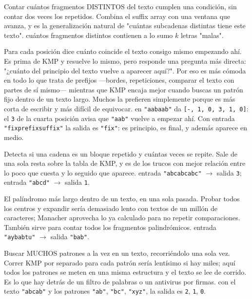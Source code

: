Contar cuántos fragmentos DISTINTOS del texto cumplen una condición, sin contar dos
veces los repetidos. Combina el suffix array con una ventana que avanza, y es la
generalización natural de "cuántas subcadenas distintas tiene este texto".
\ej cuántos fragmentos distintos contienen a lo sumo $k$ letras "malas".

Para cada posición dice cuánto coincide el texto consigo mismo empezando ahí. Es
prima de KMP y resuelve lo mismo, pero responde una pregunta más directa: "¿cuánto
del principio del texto vuelve a aparecer aquí?". Por eso es más cómoda en todo lo
que trata de prefijos —bordes, repeticiones, comparar el texto con partes de sí
mismo— mientras que KMP encaja mejor cuando buscas un patrón fijo dentro de un
texto largo. Muchos la prefieren simplemente porque es más corta de escribir y más
difícil de equivocar.
\ej en \texttt{"aabaab"} da \texttt{[-, 1, 0, 3, 1, 0]}: el \texttt{3} de la
cuarta posición avisa que \texttt{"aab"} vuelve a empezar ahí. Con entrada
\texttt{"fixprefixsuffix"} la salida es \texttt{"fix"}: es principio, es final, y
además aparece en medio.

Detecta si una cadena es un bloque repetido y cuántas veces se repite. Sale de una
sola resta sobre la tabla de KMP, y es de los trucos con mejor relación entre lo
poco que cuesta y lo seguido que aparece.
\ej entrada \texttt{"abcabcabc"} $\rightarrow$ salida \texttt{3}; entrada
\texttt{"abcd"} $\rightarrow$ salida \texttt{1}.

El palíndromo más largo dentro de un texto, en una sola pasada. Probar todos los
centros y expandir sería demasiado lento con textos de un millón de caracteres;
Manacher aprovecha lo ya calculado para no repetir comparaciones. También sirve
para contar todos los fragmentos palindrómicos.
\ej entrada \texttt{"aybabtu"} $\rightarrow$ salida \texttt{"bab"}.

Buscar MUCHOS patrones a la vez en un texto, recorriéndolo una sola vez. Correr KMP
por separado para cada patrón sería lentísimo si hay miles; aquí todos los patrones
se meten en una misma estructura y el texto se lee de corrido. Es lo que hay detrás
de un filtro de palabras o un antivirus por firmas.
\ej con el texto \texttt{"abcab"} y los patrones \texttt{"ab"}, \texttt{"bc"},
\texttt{"xyz"}, la salida es \texttt{2}, \texttt{1}, \texttt{0}.

